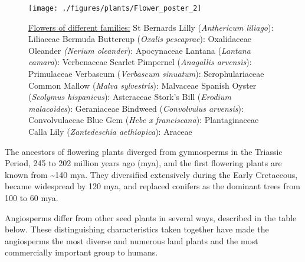 \begin{figure}

{\centering \texttt{[image: ./figures/plants/Flower\_poster\_2]} 

}

\caption{\href{https://commons.wikimedia.org/wiki/File:Flower_poster_2.jpg}{Flowers of different families:} St Bernards Lilly (\emph{Anthericum liliago}): Liliaceae Bermuda Buttercup (\emph{Oxalis pescaprae}): Oxalidaceae Oleander \emph{(Nerium oleander}): Apocynaceae Lantana (\emph{Lantana camara}): Verbenaceae Scarlet Pimpernel (\emph{Anagallis arvensis}): Primulaceae Verbascum (\emph{Verbascum sinuatum}): Scrophulariaceae Common Mallow (\emph{Malva sylvestris}): Malvaceae Spanish Oyster (\emph{Scolymus hispanicus}): Asteraceae Stork's Bill (\emph{Erodium malacoides}): Geraniaceae Bindweed (\emph{Convolvulus arvensis}): Convolvulaceae Blue Gem (\emph{Hebe x franciscana}): Plantaginaceae Calla Lily (\emph{Zantedeschia aethiopica}): Araceae}\label{fig:floweringplants}
\end{figure}

The ancestors of flowering plants diverged from gymnosperms in the Triassic Period, 245 to 202 million years ago (mya), and the first flowering plants are known from \textasciitilde140 mya. They diversified extensively during the Early Cretaceous, became widespread by 120 mya, and replaced conifers as the dominant trees from 100 to 60 mya.

Angiosperms differ from other seed plants in several ways, described in the table below. These distinguishing characteristics taken together have made the angiosperms the most diverse and numerous land plants and the most commercially important group to humans.

\onecolumn

